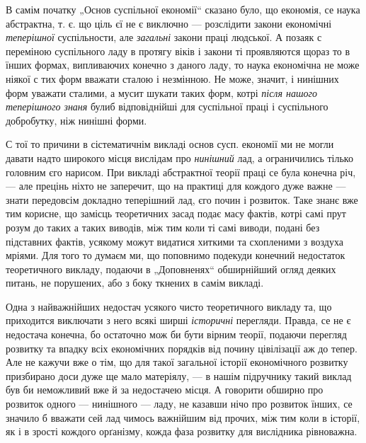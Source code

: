 


В самім
початку „Основ суспільної економії“ сказано було, що економія, се наука абстрактна, т. є. що ціль єї не є виключно — розслідити закони економічні \emph{теперішної} суспільности, але \emph{загальні} закони праці людської. А позаяк с переміною суспільного ладу в протягу віків і закони ті проявляются щораз то в їнших формах, випливаючих конечно з даного ладу, то наука економічна не може ніякої с тих форм вважати сталою і незмінною. Не може, значит, і нинішних форм уважати сталими, а мусит шукати таких форм, котрі \emph{після нашого теперішного знаня} булиб відповіднійші для суспільної праці і суспільного добробутку, ніж нинішні форми.

С тої то причини в сістематичнім викладі основ сусп. економії ми не могли давати надто широкого місця вислідам про \emph{нинішний} лад, а ограничились тілько головним єго нарисом. При викладі абстрактної теорії праці се була конечна річ, — але прецінь ніхто не заперечит, що на практиці для кождого дуже важне — знати передовсім докладно теперішний лад, єго почин і розвиток. Таке знанє вже тим корисне, що замісць теоретичних засад подає масу фактів, котрі самі прут розум до таких а таких виводів, між тим коли ті самі виводи, подані без підставних фактів, усякому можут видатися хиткими та схопленими з воздуха мріями. Для того то думаєм ми, що поповнимо подекуди конечний недостаток теоретичного викладу, подаючи в „Доповненях“ обширнійший огляд деяких питань, не порушених, або з боку ткнених в самім викладі.

Одна з найважнійших недостач усякого чисто теоретичного викладу та, що приходится виключати з него всякі ширші \emph{історичні} перегляди. Правда, се не є недостача конечна, бо остаточно мож би бути вірним теорії, подаючи перегляд розвитку та впадку всіх економічних порядків від почину цівілізації аж до тепер. Але не кажучи вже о тім, що для такої загальної історії економічного розвитку призбирано доси дуже ще мало матеріялу, — в нашім підручнику такий виклад був би неможливий вже й за недостачею місця. А говорити обширно про розвиток одного — нинішного — ладу, не казавши нічо про розвиток їнших, се значило б вважати сей лад чимось важнійшим від прочих, між тим коли в історії, як і в зрості кождого орґанізму, кожда фаза розвитку для вислідника рівноважна.

